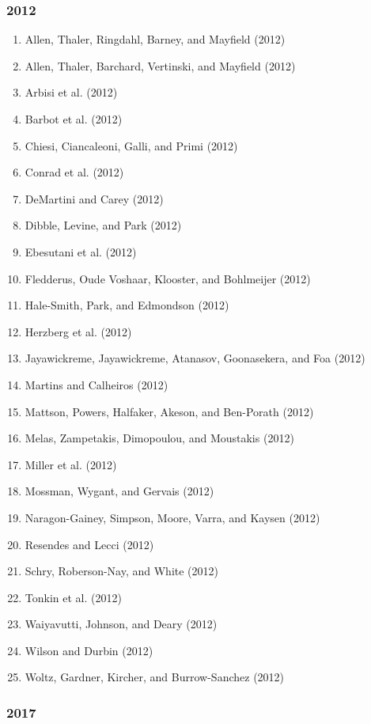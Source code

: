 \documentclass[english,man]{apa6}
\providecommand{\tightlist}{%
  \setlength{\itemsep}{0pt}\setlength{\parskip}{0pt}}
\theoremstyle{definition}
\theoremstyle{definition}
\theoremstyle{definition}
\theoremstyle{remark}
\begin{document}
\subsubsection{2012}\label{section-40}

\begin{enumerate}
\def\labelenumi{\arabic{enumi})}
\tightlist
\item
  Allen, Thaler, Ringdahl, Barney, and Mayfield (2012)
\item
  Allen, Thaler, Barchard, Vertinski, and Mayfield (2012)
\item
  Arbisi et al. (2012)
\item
  Barbot et al. (2012)
\item
  Chiesi, Ciancaleoni, Galli, and Primi (2012)
\item
  Conrad et al. (2012)
\item
  DeMartini and Carey (2012)
\item
  Dibble, Levine, and Park (2012)
\item
  Ebesutani et al. (2012)
\item
  Fledderus, Oude Voshaar, Klooster, and Bohlmeijer (2012)
\item
  Hale-Smith, Park, and Edmondson (2012)
\item
  Herzberg et al. (2012)
\item
  Jayawickreme, Jayawickreme, Atanasov, Goonasekera, and Foa (2012)
\item
  Martins and Calheiros (2012)
\item
  Mattson, Powers, Halfaker, Akeson, and Ben-Porath (2012)
\item
  Melas, Zampetakis, Dimopoulou, and Moustakis (2012)
\item
  Miller et al. (2012)
\item
  Mossman, Wygant, and Gervais (2012)
\item
  Naragon-Gainey, Simpson, Moore, Varra, and Kaysen (2012)
\item
  Resendes and Lecci (2012)
\item
  Schry, Roberson-Nay, and White (2012)
\item
  Tonkin et al. (2012)
\item
  Waiyavutti, Johnson, and Deary (2012)
\item
  Wilson and Durbin (2012)
\item
  Woltz, Gardner, Kircher, and Burrow-Sanchez (2012)
\end{enumerate}

\subsubsection{2017}\label{section-41}
\end{document}
